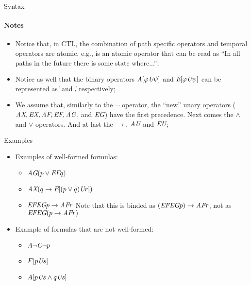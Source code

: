 \begin{frame}{Syntax}
	\framesubtitle{Notes}
	\begin{itemize}
		\item 
		{
			Notice that, in CTL, the combination of path specific operators and temporal operators are atomic, e.g., \A\F \; is an atomic operator that can be read as ``In all paths in the future there is some state where...'';
			\pause
		}
		
		\item 
		{
			Notice as well that the binary operators $\textit{A}[\varphi\textit{U}\psi]$ and $\textit{E}[\varphi\textit{U}\psi]$ can be represented as \A\U \; and \E\U, respectively;
			\pause
		}
		
		\item 
		{
			We assume that, similarly to the $\neg$ operator, the ``new'' unary operators ($\textit{A}\textit{X}, \textit{E}\textit{X}, \textit{A}\textit{F}, \textit{E}\textit{F}, \textit{A}\textit{G} $, and $ \textit{E}\textit{G} $) have the first precedence. Next comes the $\land$ and $\lor$ operators. And at last the $\to$, $\textit{A}\textit{U}$ and $\textit{E}\textit{U}$;
		}
	\end{itemize}
	
\end{frame}

\begin{frame}{Examples}
	\begin{itemize}
		\item
		{
			Examples of well-formed formulas:
			\begin{itemize}
				\item $\textit{A}\textit{G} (p \lor \textit{E}\textit{F} q)$ \pause
				\item $\textit{A}\textit{X} (q \to \textit{E}[(p\lor q) \textit{U} r])$ \pause
				\item $\textit{E}\textit{F}\textit{E}\textit{G} p \to \textit{A}\textit{F} r$ Note that this is binded as $(\textit{E}\textit{F}\textit{E}\textit{G} p) \to \textit{A}\textit{F} r$, not as $\textit{E}\textit{F}\textit{E}\textit{G} (p \to \textit{A}\textit{F} r)$
			\end{itemize}
			\pause
		}
		\item
		{
			Example of formulas that are not well-formed:
			\begin{itemize}
				\item $\textit{A}\neg\textit{G} \neg p$ \pause
				\item $F[p\textit{U} s]$ \pause
				\item $A[p\textit{U} s \land q \textit{U} s]$
			\end{itemize}
		}
	\end{itemize}
\end{frame}

